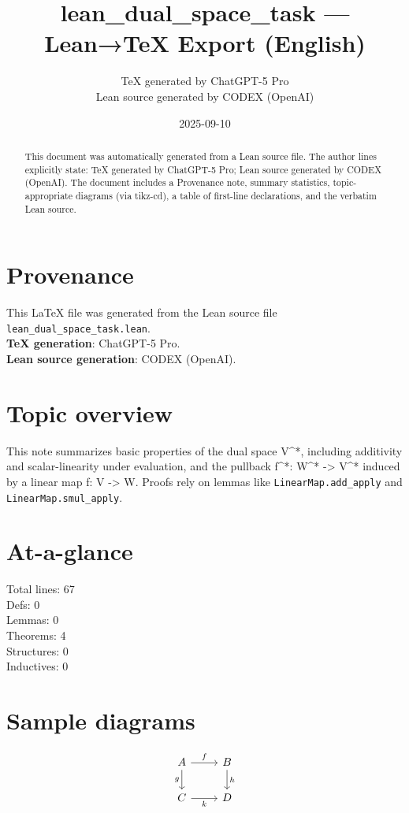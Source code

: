 \documentclass[12pt]{article}
\title{lean\_dual\_space\_task — Lean→TeX Export (English)}
\author{TeX generated by ChatGPT-5 Pro\\Lean source generated by CODEX (OpenAI)}
\date{2025-09-10}
\begin{document}
\maketitle

\begin{abstract}
This document was automatically generated from a Lean source file. The author lines explicitly state: TeX generated by ChatGPT-5 Pro; Lean source generated by CODEX (OpenAI). The document includes a Provenance note, summary statistics, topic-appropriate diagrams (via tikz-cd), a table of first-line declarations, and the verbatim Lean source.
\end{abstract}

\section*{Provenance}
This \LaTeX{} file was generated from the Lean source file \texttt{lean\_dual\_space\_task.lean}.\\
\textbf{TeX generation}: ChatGPT-5 Pro.\\
\textbf{Lean source generation}: CODEX (OpenAI).

\section*{Topic overview}
This note summarizes basic properties of the dual space V^*, including additivity and scalar-linearity under evaluation, and the pullback f^*: W^* -> V^* induced by a linear map f: V -> W. Proofs rely on lemmas like \texttt{LinearMap.add_apply} and \texttt{LinearMap.smul_apply}.

\section*{At-a-glance}
Total lines: 67\\
Defs: 0\\
Lemmas: 0\\
Theorems: 4\\
Structures: 0\\
Inductives: 0

\section*{Sample diagrams}

\[
\begin{tikzcd}
A \arrow[r, "f"] \arrow[d, "g"'] & B \arrow[d, "h"] \\
C \arrow[r, "k"'] & D
\end{tikzcd}
\]
\end{document}
